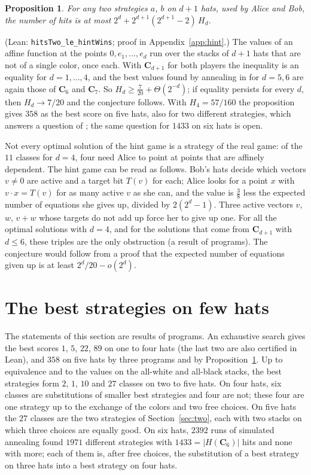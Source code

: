 \documentclass[11pt,a4paper]{article}
\newtheorem{proposition}[theorem]{Proposition}
\theoremstyle{definition}
\theoremstyle{remark}
\newcommand{\lean}[1]{\texttt{#1}}
\newcommand{\C}{\mathbf{C}}
\begin{document}
\begin{proposition}\label{prop:hint}
For any two strategies $a$, $b$ on $d+1$ hats, used by Alice and Bob,
the number of hits is at most $2^d + 2^{d+1}(2^{d+1}-2)\,H_d$.
\end{proposition}

(Lean: \lean{hitsTwo\_le\_hintWins}; proof in Appendix~\ref{app:hint}.) The values of an affine function at
the points $0, e_1, \ldots, e_d$ run over the stacks of $d+1$ hats that
are not of a single color, once each. With $\C_{d+1}$ for both players
the inequality is an equality for $d = 1,\ldots,4$, and the best values
found by annealing in \cite{Ya26} for $d = 5, 6$ are again those of
$\C_6$ and $\C_7$. So $H_d \ge \frac{7}{20} + \Theta(2^{-d})$; if equality persists for
every $d$, then $H_d \to 7/20$ and the conjecture follows. With
$H_4 = 57/160$ the proposition gives $358$ as the best score on five
hats, also for two different strategies, which answers a question of
\cite{Wa14}; the same question for $1433$ on six hats is open.

Not every optimal solution of the hint game is a strategy of the real
game: of the $11$ classes for $d = 4$, four need Alice to point at
points that are affinely dependent. The hint game can be read as
follows. Bob's hats decide which vectors $v \ne 0$ are active and a
target bit $T(v)$ for each; Alice looks for a point $x$ with
$v\cdot x = T(v)$ for as many active $v$ as she can, and the value is
$\frac{3}{8}$ less the expected number of equations she gives up,
divided by $2(2^d-1)$. Three active vectors $v$, $w$, $v+w$ whose
targets do not add up force her to give up one. For all the optimal
solutions with $d = 4$, and for the solutions that come from $\C_{d+1}$
with $d \le 6$, these triples are the only obstruction (a result of
programs). The conjecture would follow from a proof that the expected
number of equations given up is at least $2^d/20 - o(2^d)$.

\section{The best strategies on few hats}\label{sec:programs}

The statements of this section are results of programs. An exhaustive
search gives the best scores $1$, $5$, $22$, $89$ on one to four hats
(the last two are also certified in Lean), and $358$ on five hats by
three programs and by Proposition~\ref{prop:hint}. Up to equivalence and
to the values on the all-white and all-black stacks, the best strategies
form $2$, $1$, $10$ and $27$ classes on two to five hats. On four hats,
six classes are substitutions of smaller best strategies and four are
not; these four are one strategy up to the exchange of the colors and two
free choices. On five hats the $27$ classes are the two strategies of
Section~\ref{sec:two}, each with two stacks on which three choices are
equally good. On six hats, $2392$ runs of simulated annealing found
$1971$ different strategies with $1433 = |H(\C_6)|$ hits and none with
more; each of them is, after free choices, the substitution of a best
strategy on three hats into a best strategy on four hats.
\end{document}
